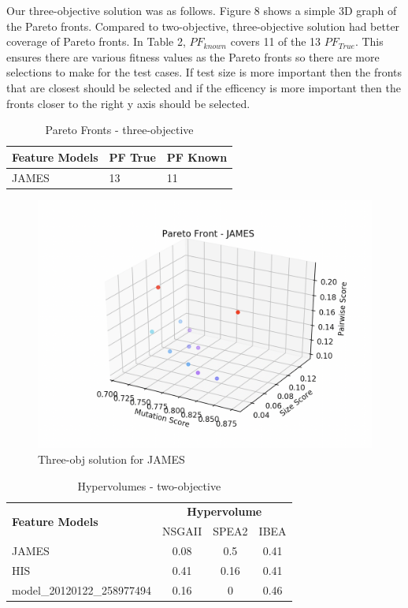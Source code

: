 \documentclass[a4paper,12pt]{article}
\begin{document}
Our three-objective solution was as follows. Figure 8 shows a simple 3D graph of the Pareto fronts. Compared to two-objective, three-objective solution had better coverage of Pareto fronts. In Table 2, $PF_{known}$ covers 11 of the 13 $PF_{True}$. This ensures there are various fitness values as the Pareto fronts so there are more selections to make for the test cases. If test size is more important then the fronts that are closest should be selected and if the efficency is more important then the fronts closer to the right y axis should be selected.\par
\begin{table}[h!]
\centering
\begin{tabular}{|l|l|l|}
\hline
\textbf{Feature Models} & \textbf{PF True} & \textbf{PF Known} \\ \hline
JAMES                   & 13               & 11                \\ \hline
\end{tabular}
\caption{Pareto Fronts - three-objective}
\label{table:computerNo}
\end{table}
\begin{figure}[h!]
\centering
\includegraphics[width=.7\linewidth]{Images/3D.png}
\caption{Three-obj solution for JAMES}
\label{fig:computerNo}
\end{figure} \par

\begin{table}[h!]
\centering
\begin{tabular}{|l|c|c|c|}
\hline
\multirow{2}{*}{\textbf{Feature Models}} & \multicolumn{3}{c|}{\textbf{Hypervolume}} \\ \cline{2-4} 
                                         & NSGAII        & SPEA2        & IBEA       \\ \hline
JAMES                                    & 0.08          & 0.5          & 0.41       \\ \hline
HIS                                      & 0.41          & 0.16         & 0.41       \\ \hline
model\_20120122\_258977494               & 0.16          & 0            & 0.46       \\ \hline
\end{tabular}
\caption{Hypervolumes - two-objective}
\label{table:computerNo}
\end{table}
\par
\end{document}
